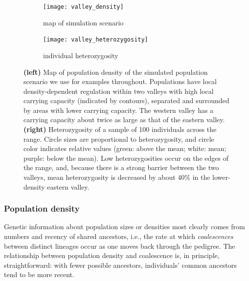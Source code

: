 \documentclass{ar-1col}
\renewcommand{\emph}[1]{{\textit{#1}}}
\begin{document}
\begin{figure}	%
    \centering
    \begin{subfigure}{0.95\textwidth}
        \centering
        \texttt{[image: valley\_density]}
        \caption{map of simulation scenario}
        \label{valley_map}
    \end{subfigure}
    \begin{subfigure}{0.95\textwidth}
        \centering
        \texttt{[image: valley\_heterozygosity]}
        \caption{individual heterozygosity}
        \label{valley_het}
    \end{subfigure}
        \caption{
            \textbf{(left)} Map of population density of the simulated population scenario
            we use for examples throughout.
            Populations have local density-dependent regulation
            within two valleys with high local carrying capacity (indicated by contours),
            separated and surrounded by areas with lower carrying capacity.
            The western valley has a carrying capacity about twice as large as that of the eastern valley.
            \textbf{(right)} Heterozygosity of a sample of 100 individuals across the range.
            Circle sizes are proportional to heterozygosity,
            and circle color indicates relative values
            (green: above the mean; white: mean; purple: below the mean).
            Low heterozygosities occur on the edges of the range,
            and, because there is a strong barrier between the two valleys,
            mean heterozygosity is decreased by about 40\% in the lower-density eastern valley.
		}
        \label{pop_density}
\end{figure}



\subsubsection{Population density}

Genetic information about population sizes or densities most clearly
comes from numbers and recency of shared ancestors, 
i.e., the rate at which \emph{coalescences} between distinct lineages
occur as one moves back through the pedigree.
The relationship between population density and coalescence is, in principle, straightforward:
with fewer possible ancestors,
individuals' common ancestors tend to be more recent.
\end{document}
